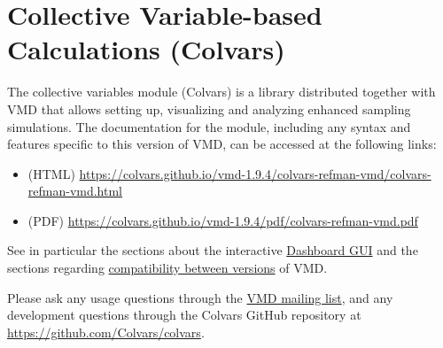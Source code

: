 \section{Collective Variable-based Calculations (Colvars)}
\label{section:colvars}

The collective variables module (Colvars) is a library distributed together with VMD that allows setting up, visualizing and analyzing enhanced sampling simulations.
The documentation for the module, including any syntax and features specific to this version of VMD, can be accessed at the following links:
\begin{itemize}
\item (HTML) \url{https://colvars.github.io/vmd-1.9.4/colvars-refman-vmd/colvars-refman-vmd.html}
\item (PDF) \url{https://colvars.github.io/vmd-1.9.4/pdf/colvars-refman-vmd.pdf}
\end{itemize}
\noindent{}See in particular the sections about the interactive \href{}{Dashboard GUI} and the sections regarding \href{https://colvars.github.io/vmd-1.9.4/colvars-refman-vmd/colvars-refman-vmd.html#sec:colvars_config_changes}{compatibility between versions} of VMD.
 
Please ask any usage questions through the \href{https://www.ks.uiuc.edu/Research/vmd/mailing_list/}{VMD mailing list}, and any development questions through the Colvars GitHub repository at \url{https://github.com/Colvars/colvars}.
